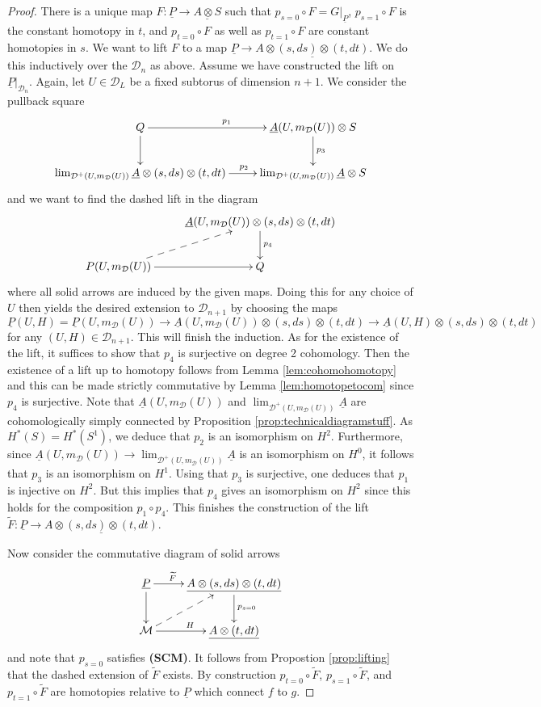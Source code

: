 \documentclass[12pt,a4paper]{article}
\theoremstyle{definition}
\begin{document}
\begin{proof}
There is a unique map $F\colon\underline{P}\rightarrow \underline{A\otimes S}$ such that $p_{s=0}\circ F= G|_{\underline{P}}$, $p_{s=1}\circ F$ is the constant homotopy in $t$, and $p_{t=0}\circ F$ as well as $p_{t=1}\circ F$ are constant homotopies in $s$. We want to lift $F$ to a map $\underline{P}\rightarrow \underline{A\otimes (s,ds)\otimes (t,dt)}$. We do this inductively over the $\mathcal{D}_n$ as above. Assume we have constructed the lift on $\underline{P}|_{\mathcal{D}_n}$. Again, let $U\in\mathcal{D}_L$ be a fixed subtorus of dimension $n+1$.
We consider the pullback square
\[\xymatrix{
 Q\ar[d]\ar[r]^{p_1} & \underline{A}(U,m_\mathcal{D}(U))\otimes S\ar[d]^{p_3}\\
\lim_{\mathcal{D}^+(U,m_\mathcal{D}(U))}\underline{A}\otimes (s,ds)\otimes(t,dt)\ar[r]^(.6){p_2} & \lim_{\mathcal{D}^+(U,m_\mathcal{D}(U))}\underline{A}\otimes S
}\]
and we want to find the dashed lift in the diagram
\[\xymatrix{
& \underline{A}(U,m_\mathcal{D}(U))\otimes (s,ds)\otimes(t,dt)\ar[d]^{p_4}\\
\ar@{-->}[ru]P(U,m_\mathcal{D}(U))\ar[r] & Q
}\]
where all solid arrows are induced by the given maps.
Doing this for any choice of $U$ then yields the desired extension to $\mathcal{D}_{n+1}$ by choosing the maps $\underline{P}(U,H)=\underline{P}(U,m_\mathcal{D}(U))\rightarrow \underline{A}(U,m_\mathcal{D}(U))\otimes (s,ds)\otimes (t,dt)\rightarrow \underline{A}(U,H)\otimes (s,ds)\otimes(t,dt)$ for any $(U,H)\in\mathcal{D}_{n+1}$. This will finish the induction. As for the existence of the lift, it suffices to show that $p_4$ is surjective on degree 2 cohomology. Then the existence of a lift up to homotopy follows from Lemma \ref{lem:cohomohomotopy} and this can be made strictly commutative by Lemma \ref{lem:homotopetocom} since $p_4$ is surjective. Note that $\underline{A}(U,m_\mathcal{D}(U))$ and $\lim_{\mathcal{D}^+(U,m_\mathcal{D}(U))}\underline{A}$ are cohomologically simply connected by Proposition \ref{prop:technicaldiagramstuff}. As $H^*(S)=H^*(S^1)$, we deduce that $p_2$ is an isomorphism on $H^2$. Furthermore, since $\underline{A}(U,m_\mathcal{D}(U))\rightarrow\lim_{\mathcal{D}^+(U,m_\mathcal{D}(U))}\underline{A}$ is an isomorphism on $H^0$, it follows that $p_3$ is an isomorphism on $H^1$. Using that $p_3$ is surjective, one deduces that $p_1$ is injective on $H^2$. But this implies that $p_4$ gives an isomorphism on $H^2$ since this holds for the composition $p_1\circ p_4$. This finishes the construction of the lift $\widetilde{F}\colon \underline{P}\rightarrow \underline{A\otimes (s,ds)\otimes (t,dt)}$.

Now consider the commutative diagram of solid arrows
\[\xymatrix{
\underline{P}\ar[d]\ar[r]^(.3){\widetilde{F}} & \underline{A\otimes (s,ds)\otimes(t,dt)}\ar[d]^{p_{s=0}}\\
\mathcal{M}\ar[r]^{H}\ar@{-->}[ur] & \underline{A\otimes (t,dt)}
}\]
and note that $p_{s=0}$ satisfies \textbf{(SCM)}. It follows from Propostion \ref{prop:lifting} that the dashed extension of $\widetilde{F}$ exists. By construction $p_{t=0}\circ \widetilde{F}$, $p_{s=1}\circ \widetilde{F}$, and $p_{t=1}\circ \widetilde{F}$ are homotopies relative to $\underline{P}$ which connect $f$ to $g$.
\end{proof}
\end{document}
